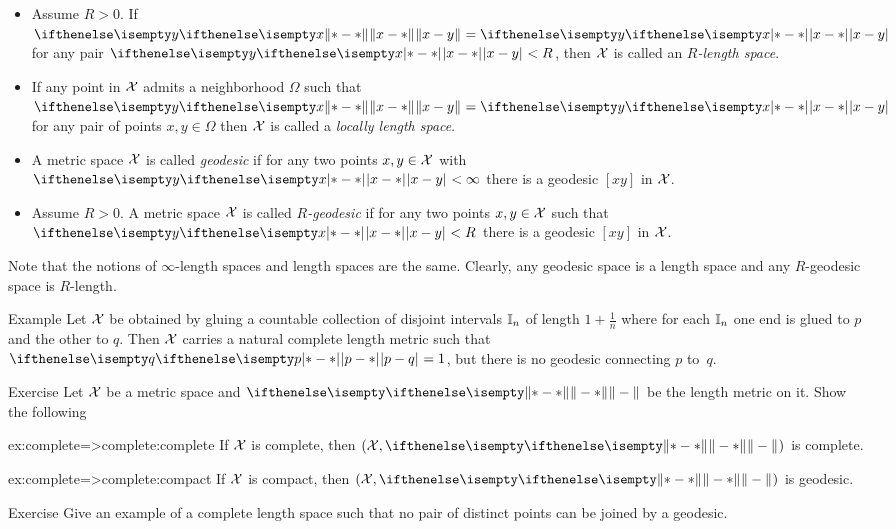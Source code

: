 \begin{itemize}
\item Assume $R>0$.
If $\yetdist{x}{y}{}=\dist{x}{y}{}$ for any pair $\dist{x}{y}{}<R$, then $\mathcal{X}$ is called an \emph{$R$-length space}.
\item If any point in $\mathcal{X}$ admits a neighborhood  $\Omega$ such that $\yetdist{x}{y}{}=\dist{x}{y}{}$ for any pair of points $x,y\in \Omega$
then  $\mathcal{X}$ is called a \emph{locally length space}.
\item A metric space $\mathcal{X}$ is called 
\emph{geodesic}%
if for any two points $x,y\in \spc{X}$ with $\dist{x}{y}{}<\infty$ there is a geodesic $[x y]$ in $\mathcal{X}$.
\item Assume $R>0$. A metric space $\mathcal{X}$ is called 
\emph{$R$-geodesic}%
if for any two points $x,y\in \spc{X}$ such that $\dist{x}{y}{}<R$ there is a geodesic $[x y]$ in $\mathcal{X}$.
\end{itemize}

Note that the notions of $\infty$-length spaces and length spaces are the same.
Clearly, any geodesic space is a length space 
and any $R$-geodesic space is $R$-length.

\begin{thm}{Example} 
Let $\mathcal{X}$ be obtained by gluing a countable collection of disjoint intervals $\mathbb{I}_n$ of length $1+\tfrac1n$ where for each $\mathbb{I}_n$ one end is glued to $p$ and the other to $q$.
Then $\mathcal{X}$ carries a natural complete length metric such that $\dist{p}{q}{}=1$, but there is no geodesic connecting $p$ to~$q$.
\end{thm}

\begin{thm}{Exercise}\label{ex:complete=>complete}
Let $\mathcal{X}$ be a metric space
and $\yetdist{}{}{}$ be the length metric on it.
Show the following
\begin{subthm}{ex:complete=>complete:complete}
If $\mathcal{X}$  is complete, then  $(\spc{X},\yetdist{}{}{})$ is complete.
\end{subthm}

\begin{subthm}{ex:complete=>complete:compact}
If $\mathcal{X}$ is compact, then $(\spc{X},\yetdist{}{}{})$ is geodesic.
\end{subthm}
\end{thm}


\begin{thm}{Exercise}\label{ex:no-geod}
Give an example of a complete length space such that no pair of distinct points can be joined by a geodesic.
\end{thm}

